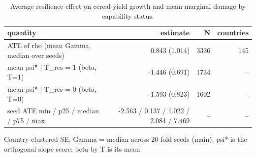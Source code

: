 \begin{table}[htbp]
\centering
\caption{Average resilience effect on cereal-yield growth and mean marginal damage by capability status.}
\label{tab:agri_ate}
\begin{tabular}{lrrr}
\toprule
quantity & estimate & N & countries \\
\midrule
ATE of rho (mean Gamma, median over seeds) & 0.843 (1.014) & 3336 & 145 \\
mean psi* | T\_res = 1 (beta, T=1) & -1.446 (0.691) & 1734 & -- \\
mean psi* | T\_res = 0 (beta, T=0) & -1.593 (0.823) & 1602 & -- \\
seed ATE min / p25 / median / p75 / max & -2.563 / 0.137 / 1.022 / 2.084 / 7.469 & -- & -- \\
\bottomrule
\end{tabular}
\par\smallskip\footnotesize Country-clustered SE. Gamma = median across 20 fold seeds (main). psi* is the orthogonal slope score; beta by T is its mean.
\end{table}
